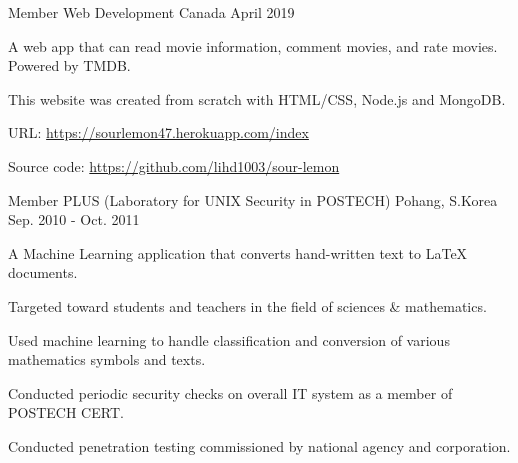 \begin{cventries}

  \cventry
    {Member} %
    {Web Development} %
    {Canada} %
    {April 2019} %
    {
      \begin{cvitems} %
        \item {A web app that can read movie information, comment movies, and rate movies. Powered by TMDB. }
        \item {This website was created from scratch with HTML/CSS, Node.js and MongoDB.}
        \item {URL: \url{https://sourlemon47.herokuapp.com/index}}
        \item {Source code: \url{https://github.com/lihd1003/sour-lemon}}
      \end{cvitems}
    }

  \cventry
    {Member} %
    {PLUS (Laboratory for UNIX Security in POSTECH)} %
    {Pohang, S.Korea} %
    {Sep. 2010 - Oct. 2011} %
    {
      \begin{cvitems} %
        \item {A Machine Learning application that converts hand-written text to LaTeX documents.}
        \item {Targeted toward students and teachers in the field of sciences & mathematics.}
        \item {Used machine learning to handle classification and conversion of various mathematics symbols and texts.}\
        \item {Conducted periodic security checks on overall IT system as a member of POSTECH CERT.}
        \item {Conducted penetration testing commissioned by national agency and corporation.}
      \end{cvitems}
    }


\end{cventries}
